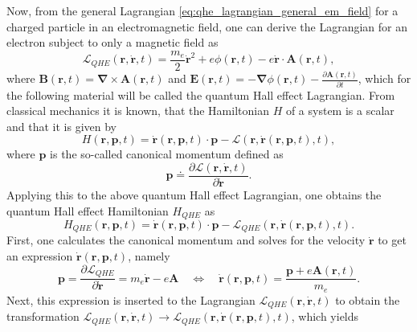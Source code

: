 \documentclass{report}
\numberwithin{tm}{section}
\newcommand\vect[1]{\ensuremath{\bm{#1}}}
\begin{document}
Now, from the general Lagrangian \cref{eq:qhe_lagrangian_general_em_field} for a charged particle in an electromagnetic field, one can derive the Lagrangian for an electron subject to only a magnetic field as \begin{equation}
	\mathcal{L}_{QHE}(\vect{r}, \dot{\vect{r}},t) = \frac{m_e}{2}\dot{\vect{r}}^2 + e\phi(\vect{r},t)- e\dot{\vect{r}}\cdot \vect{A}(\vect{r},t),
\end{equation} where $\vect{B}(\vect{r},t) = \vect{\nabla}\times \vect{A}(\vect{r},t)$ and $\vect{E}(\vect{r},t) = -\vect{\nabla}\phi(\vect{r},t) - \frac{\partial \vect{A}(\vect{r},t)}{\partial t}$, which for the following material will be called the quantum Hall effect Lagrangian. From classical mechanics it is known, that the Hamiltonian $H$ of a system is a scalar and that it is given by \begin{equation}
H(\vect{r},\vect{p},t) = \dot{\vect{r}}(\vect{r},\vect{p},t)\cdot \vect{p} - \mathcal{L}(\vect{r},\dot{\vect{r}}(\vect{r},\vect{p},t),t),
\end{equation} where $\vect{p}$ is the so-called canonical momentum defined as \begin{equation}\label{eq:canonical_momentum_definition}
\vect{p} \doteq \frac{\partial \mathcal{L}(\vect{r},\dot{\vect{r}},t)}{\partial \dot{\vect{r}}}.
\end{equation} Applying this to the above quantum Hall effect Lagrangian, one obtains the quantum Hall effect Hamiltonian $H_{QHE}$ as \begin{equation}\label{eq:qhe_der_ham_1}
H_{QHE}(\vect{r},\vect{p},t) = \dot{\vect{r}}(\vect{r},\vect{p},t)\cdot \vect{p} - \mathcal{L}_{QHE}(\vect{r},\dot{\vect{r}}(\vect{r},\vect{p},t),t).
\end{equation} First, one calculates the canonical momentum and solves for the velocity $\dot{\vect{r}}$ to get an expression $\dot{\vect{r}}(\vect{r},\vect{p},t)$, namely \begin{equation}\label{eq:qhe_der_ham_2}
\vect{p} = \frac{\partial \mathcal{L}_{QHE}}{\partial \dot{\vect{r}}} = m_e\dot{\vect{r}}-e\vect{A} \quad \Leftrightarrow \quad \dot{\vect{r}}(\vect{r},\vect{p},t) = \frac{\vect{p}+e\vect{A}(\vect{r},t)}{m_e}.
\end{equation} Next, this expression is inserted to the Lagrangian $\mathcal{L}_{QHE}(\vect{r},\dot{\vect{r}},t)$ to obtain the transformation $\mathcal{L}_{QHE}(\vect{r},\dot{\vect{r}},t)\rightarrow \mathcal{L}_{QHE}(\vect{r},\dot{\vect{r}}(\vect{r},\vect{p},t),t)$, which yields \begin{align}\begin{aligned}\label{eq:qhe_der_ham_3}

\end{aligned}
\end{align}
\end{document}
